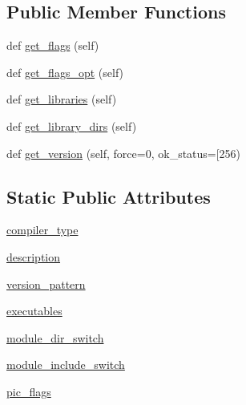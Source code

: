 \subsection*{Public Member Functions}
\begin{DoxyCompactItemize}
\item 
def \hyperlink{classnumpy_1_1distutils_1_1fcompiler_1_1hpux_1_1HPUXFCompiler_a912aceb0d530697e048e9a6b7e324ce7}{get\+\_\+flags} (self)
\item 
def \hyperlink{classnumpy_1_1distutils_1_1fcompiler_1_1hpux_1_1HPUXFCompiler_a9d42f9baabdda62c2d1b4991b2f7d538}{get\+\_\+flags\+\_\+opt} (self)
\item 
def \hyperlink{classnumpy_1_1distutils_1_1fcompiler_1_1hpux_1_1HPUXFCompiler_a6f0e7108c991ecc20341a4e7db744ddf}{get\+\_\+libraries} (self)
\item 
def \hyperlink{classnumpy_1_1distutils_1_1fcompiler_1_1hpux_1_1HPUXFCompiler_a600383a784b687cd803ce386b1e1e4f2}{get\+\_\+library\+\_\+dirs} (self)
\item 
def \hyperlink{classnumpy_1_1distutils_1_1fcompiler_1_1hpux_1_1HPUXFCompiler_a905116803432d1a22891cf0cc967acf7}{get\+\_\+version} (self, force=0, ok\+\_\+status=\mbox{[}256)
\end{DoxyCompactItemize}
\subsection*{Static Public Attributes}
\begin{DoxyCompactItemize}
\item 
\hyperlink{classnumpy_1_1distutils_1_1fcompiler_1_1hpux_1_1HPUXFCompiler_a779d5de5ddaef5406b90cb8a2e78d795}{compiler\+\_\+type}
\item 
\hyperlink{classnumpy_1_1distutils_1_1fcompiler_1_1hpux_1_1HPUXFCompiler_a32b6c149fd00f4ff77618464e31059cf}{description}
\item 
\hyperlink{classnumpy_1_1distutils_1_1fcompiler_1_1hpux_1_1HPUXFCompiler_ace65e4c50d987b765268c3c7bf4bac6c}{version\+\_\+pattern}
\item 
\hyperlink{classnumpy_1_1distutils_1_1fcompiler_1_1hpux_1_1HPUXFCompiler_a2818acaa0a2a41801c314206642eb78a}{executables}
\item 
\hyperlink{classnumpy_1_1distutils_1_1fcompiler_1_1hpux_1_1HPUXFCompiler_aa6af5339645b76f7120f64d9d0c47700}{module\+\_\+dir\+\_\+switch}
\item 
\hyperlink{classnumpy_1_1distutils_1_1fcompiler_1_1hpux_1_1HPUXFCompiler_ac12cc212471d69e84d39a6643a788335}{module\+\_\+include\+\_\+switch}
\item 
\hyperlink{classnumpy_1_1distutils_1_1fcompiler_1_1hpux_1_1HPUXFCompiler_a47715de7d47db7f31856fe2e3363ce2a}{pic\+\_\+flags}
\end{DoxyCompactItemize}


